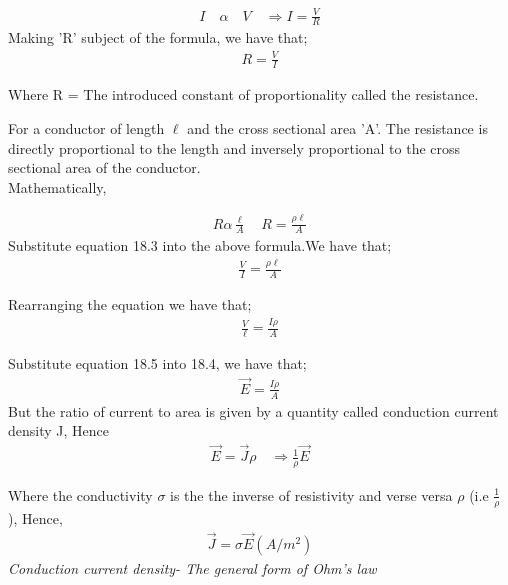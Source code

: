 \begin{align*}
I\quad\alpha\quad V \quad\Rightarrow I = \frac{V}{R}
\end{align*} 
Making 'R' subject of the formula, we have that; \\
\begin{align}
R =  \frac{V}{I}
\end{align}
\begin{center}
	Where R = The introduced constant of proportionality called the resistance.
\end{center}
For a conductor of length $\ell$ and the cross sectional area 'A'. The resistance is directly proportional to the length and inversely proportional to the cross sectional area of the conductor. \\
Mathematically, 

\begin{align*}
R \alpha \frac{\ell}{A}\quad R = \frac{\rho\ell}{A}
\end{align*}
Substitute equation 18.3 into the above formula.We have that; \\

\begin{align*}
\frac{V}{I} = \frac{\rho\ell}{A}
\end{align*}

Rearranging the equation we have that; \\
\begin{align}
\frac{V}{\ell} = \frac{I\rho}{A}
\end{align}

Substitute equation 18.5 into 18.4, we have that; \\
\begin{align*}
\vec{E} = \frac{I\rho}{A}
\end{align*}
But the ratio of current to area is given by a quantity called conduction current density J, Hence \\

\begin{align*}
\vec{E} = \vec{J}\rho \quad \Rightarrow \frac{1}{\rho}\vec{E}
\end{align*}

Where the conductivity $ \sigma $ is the the inverse of resistivity and verse versa $ \rho $  (i.e $ \frac{1}{\rho} $ ), Hence, \\

\begin{align}
\boxed{\vec{J} = \sigma \vec{E}} (A/m^{2})
\end{align}
\emph{Conduction current density- The general form of Ohm's law} \\

